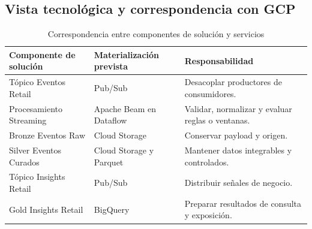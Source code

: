 \documentclass[11pt,a4paper]{article}
\begin{document}
\subsection{Vista tecnológica y correspondencia con GCP}
\begin{table}[H]
\caption{Correspondencia entre componentes de solución y servicios}\label{tab:componentes}
\small\begin{tabularx}{\linewidth}{@{}P{.32\linewidth}YY@{}}\toprule
Componente de solución & Materialización prevista & Responsabilidad\\\midrule
Tópico Eventos Retail & Pub/Sub & Desacoplar productores de consumidores.\\
Procesamiento Streaming & Apache Beam en Dataflow & Validar, normalizar y evaluar reglas o ventanas.\\
Bronze Eventos Raw & Cloud Storage & Conservar payload y origen.\\
Silver Eventos Curados & Cloud Storage y Parquet & Mantener datos integrables y controlados.\\
Tópico Insights Retail & Pub/Sub & Distribuir señales de negocio.\\
Gold Insights Retail & BigQuery & Preparar resultados de consulta y exposición.\\\bottomrule
\end{tabularx}
\end{table}
\end{document}
